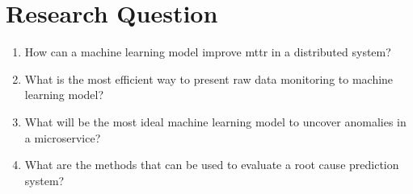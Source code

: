 
{\let\clearpage\relax\chapter{Research Question}}


\begin{enumerate}[leftmargin=*,label=\textbf{RQ\arabic*:}]

\item How can a machine learning model improve \ac{mttr} in a distributed system?

\item What is the most efficient way to present raw data monitoring to machine learning model?

\item What will be the most ideal machine learning model to uncover anomalies in a microservice?

\item What are the methods that can be used to evaluate a root cause prediction system?

\end{enumerate}


